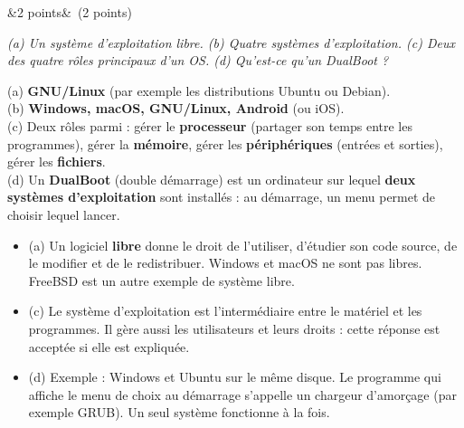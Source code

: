 \documentclass[11pt, a4paper]{exam}
\newcommand{\Q}[3]{\par\needspace{5\baselineskip}\bigskip\noindent{\large\bfseries Question #1}\ifx&#2&\else\ \textnormal{(#2)}\fi\par\nopagebreak\smallskip\noindent\textit{#3}\par\nopagebreak\smallskip}
\begin{document}
\Q{6}{2 points}{(a) Un système d'exploitation libre. (b) Quatre systèmes d'exploitation. (c) Deux des quatre rôles principaux d'un OS. (d) Qu'est-ce qu'un DualBoot ?}
\begin{reponse}
(a) \textbf{GNU/Linux} (par exemple les distributions Ubuntu ou Debian). \\
(b) \textbf{Windows, macOS, GNU/Linux, Android} (ou iOS). \\
(c) Deux rôles parmi : gérer le \textbf{processeur} (partager son temps entre les programmes), gérer la \textbf{mémoire}, gérer les \textbf{périphériques} (entrées et sorties), gérer les \textbf{fichiers}. \\
(d) Un \textbf{DualBoot} (double démarrage) est un ordinateur sur lequel \textbf{deux systèmes d'exploitation} sont installés : au démarrage, un menu permet de choisir lequel lancer.
\end{reponse}
\begin{itemize}
\item (a) Un logiciel \textbf{libre} donne le droit de l'utiliser, d'étudier son code source, de le modifier et de le redistribuer. Windows et macOS ne sont pas libres. FreeBSD est un autre exemple de système libre.
\item (c) Le système d'exploitation est l'intermédiaire entre le matériel et les programmes. Il gère aussi les utilisateurs et leurs droits : cette réponse est acceptée si elle est expliquée.
\item (d) Exemple : Windows et Ubuntu sur le même disque. Le programme qui affiche le menu de choix au démarrage s'appelle un chargeur d'amorçage (par exemple GRUB). Un seul système fonctionne à la fois.
\end{itemize}
\end{document}
